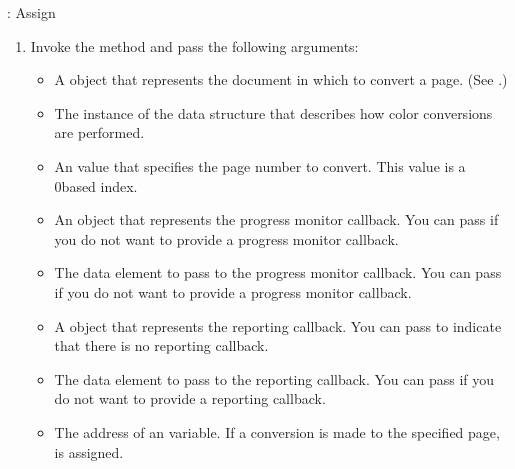 \documentclass[letterpaper,12pt,english,openany,oneside]{sphinxmanual}
\begin{document}
: Assign 
\begin{enumerate}
%
\setcounter{enumi}{6}
\item {} 
Invoke the  method and pass the following arguments:
\begin{itemize}
\item {} 
A  object that represents the document in which to convert a page. (See .)

\item {} 
The instance of the  data structure that describes how color conversions are performed.

\item {} 
An  value that specifies the page number to convert. This value is a 0\sphinxhyphen{}based index.

\item {} 
An  object that represents the progress monitor callback. You can pass  if you do not want to provide a progress monitor callback.

\item {} 
The data element to pass to the progress monitor callback. You can pass  if you do not want to provide a progress monitor callback.

\item {} 
A  object that represents the reporting callback. You can pass  to indicate that there is no reporting callback.

\item {} 
The data element to pass to the reporting callback. You can pass  if you do not want to provide a reporting callback.

\item {} 
The address of an  variable. If a conversion is made to the specified page,  is assigned.

\end{itemize}

\end{enumerate}
\end{document}
